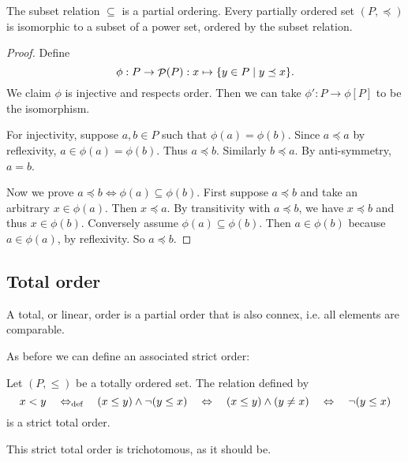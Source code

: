\begin{proposition} \label{prop:posetPowerset}
The subset relation $\subseteq$ is a partial ordering. Every partially ordered set $(P,\preceq)$ is isomorphic to a subset of a power set, ordered by the subset relation.
\end{proposition}
\begin{proof}
Define
\[ \phi: P \to \mathop{\mathcal{P}}(P): x \mapsto \{ y\in P\;|\; y\preceq x \}. \]
We claim $\phi$ is injective and respects order. Then we can take $\phi':P\to \phi[P]$ to be the isomorphism.

For injectivity, suppose $a,b\in P$ such that $\phi(a)=\phi(b)$. Since $a\preceq a$ by reflexivity, $a\in \phi(a) = \phi(b)$. Thus $a\preceq b$. Similarly $b \preceq a$. By anti-symmetry, $a=b$.

Now we prove $a \preceq b \iff \phi(a)\subseteq \phi(b)$. First suppose $a\preceq b$ and take an arbitrary $x\in\phi(a)$. Then $x \preceq a$. By transitivity with $a\preceq b$, we have $x\preceq b$ and thus $x\in\phi(b)$. Conversely assume $\phi(a)\subseteq \phi(b)$. Then $a\in\phi(b)$ because $a\in\phi(a)$, by reflexivity. So $a\preceq b$.
\end{proof}



\subsection{Total order}
A total, or linear, order is a partial order that is also connex, i.e. all elements are comparable.

As before we can define an associated strict order:
\begin{lemma}
Let $(P, \leq)$ be a totally ordered set. The relation defined by
\[ x < y \quad\Leftrightarrow_{\text{def}}\quad (x\leq y)\land \neg(y\leq x) \quad \Leftrightarrow \quad (x\leq y)\land (y\neq x) \quad \Leftrightarrow \quad \neg(y\leq x)  \]
is a strict total order.
\end{lemma}
This strict total order is trichotomous, as it should be.

